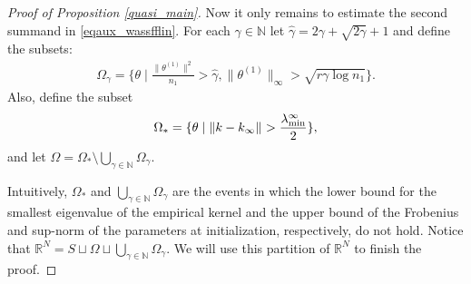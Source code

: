 \documentclass{article}
\theoremstyle{definition}
\theoremstyle{remark}
\numberwithin{equation}{section}
\newcommand{\R}{\mathbb{R}}
\newcommand{\N}{\mathbb{N}}
\newcommand{\lammin}{\lambda_{\textup{min}}}
\newcommand{\norm}[2]{
    \|#1\|_{#2}
}
\begin{document}
\begin{proof}[Proof of Proposition \ref{quasi_main}]
    Now it only remains to estimate the second summand in \eqref{eqaux_wassfflin}.
    For each $\gamma \in \N$ let $\hat \gamma = 2\gamma + \sqrt{2 \gamma} + 1$ and define the subsets:
    \begin{align}
        \Omega_\gamma = \{\theta \mid \frac{\norm{\theta^{(1)}}{}^2}{n_1} >\hat \gamma, \norm{\theta^{(1)}}{\infty} > \sqrt{r\gamma \log n_1}\}.
    \end{align}
    Also, define the subset
    \begin{align}
        \Omega_* = \{\theta \mid\norm{k-k_\infty}{}> \frac{\lammin^\infty}{2}\},
    \end{align}
    and let $\Omega = \Omega_* \setminus \bigcup_{\gamma \in \N}\Omega_\gamma$.

    Intuitively, $\Omega_*$ and $\bigcup_{\gamma \in \N}\Omega_\gamma$ are the events in which the lower bound for the smallest eigenvalue of the empirical kernel
    and the upper bound of the Frobenius and sup-norm of the parameters at initialization, respectively, do not hold.
    Notice that $\R^N = S \sqcup \Omega \sqcup \bigcup_{\gamma \in \N}\Omega_\gamma$.
    We will use this partition of $\R^N$ to finish the proof.


\end{proof}
\end{document}
